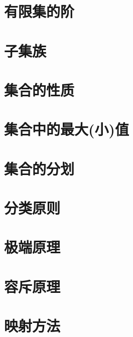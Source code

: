 \section{有限集的阶}
\section{子集族}
\section{集合的性质}
\section{集合中的最大(小)值}
\section{集合的分划}
\section{分类原则}
\section{极端原理}
\section{ 容斥原理}
\section{ 映射方法}